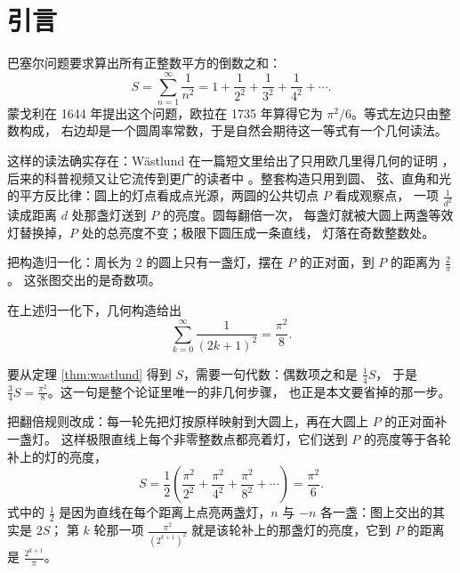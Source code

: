 \section{引言}

巴塞尔问题要求算出所有正整数平方的倒数之和：
\begin{equation}
  S=\sum_{n=1}^{\infty}\frac{1}{n^{2}}
   =1+\frac{1}{2^{2}}+\frac{1}{3^{2}}+\frac{1}{4^{2}}+\cdots .
  \label{eq:basel}
\end{equation}
蒙戈利在 1644 年提出这个问题，欧拉在 1735 年算得它为 $\pi^{2}/6$。等式左边只由整数构成，
右边却是一个圆周率常数，于是自然会期待这一等式有一个几何读法。

这样的读法确实存在：Wästlund 在一篇短文里给出了只用欧几里得几何的证明 \cite{wastlund}，
后来的科普视频又让它流传到更广的读者中 \cite{threeblueonebrown}。整套构造只用到圆、
弦、直角和光的平方反比律：圆上的灯点看成点光源，两圆的公共切点 $P$ 看成观察点，
一项 $\frac{1}{d^{2}}$ 读成距离 $d$ 处那盏灯送到 $P$ 的亮度。圆每翻倍一次，
每盏灯就被大圆上两盏等效灯替换掉，$P$ 处的总亮度不变；极限下圆压成一条直线，
灯落在奇数整数处。

把构造归一化：周长为 $2$ 的圆上只有一盏灯，摆在 $P$ 的正对面，到 $P$ 的距离为 $\frac{2}{\pi}$。
这张图交出的是奇数项。

\begin{theorem}[Wästlund]\label{thm:wastlund}
在上述归一化下，几何构造给出
\begin{equation}
  \sum_{k=0}^{\infty}\frac{1}{(2k+1)^{2}}=\frac{\pi^{2}}{8}.
  \label{eq:odd-sum}
\end{equation}
\end{theorem}

要从定理 \ref{thm:wastlund} 得到 $S$，需要一句代数：偶数项之和是 $\frac14 S$，
于是 $\frac34 S=\frac{\pi^{2}}{8}$。这一句是整个论证里唯一的非几何步骤，
也正是本文要省掉的那一步。

\begin{theorem}[本文]\label{thm:direct}
把翻倍规则改成：每一轮先把灯按原样映射到大圆上，再在大圆上 $P$ 的正对面补一盏灯。
这样极限直线上每个非零整数点都亮着灯，它们送到 $P$ 的亮度等于各轮补上的灯的亮度，
\begin{equation}
  S=\frac{1}{2}\left(\frac{\pi^{2}}{2^{2}}+\frac{\pi^{2}}{4^{2}}+\frac{\pi^{2}}{8^{2}}+\cdots\right)
   =\frac{\pi^{2}}{6}.
  \label{eq:direct}
\end{equation}
式中的 $\frac12$ 是因为直线在每个距离上点亮两盏灯，$n$ 与 $-n$ 各一盏：图上交出的其实是 $2S$；
第 $k$ 轮那一项 $\frac{\pi^{2}}{(2^{k+1})^{2}}$ 就是该轮补上的那盏灯的亮度，它到 $P$ 的距离是
$\frac{2^{k+1}}{\pi}$。
\end{theorem}

